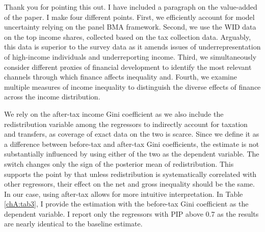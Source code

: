 \begin{enumerate}[resume]
    Thank you for pointing this out. I have included a paragraph on the value-added of the paper. I make four different points. First, we efficiently account for model uncertainty relying on the panel \ac{BMA} framework. Second, we use the \ac{WID} data on the top income shares, collected based on the tax collection data. Arguably, this data is superior to the survey data as it amends issues of underrepresentation of high-income individuals and underreporting income. Third, we simultaneously consider different proxies of financial development to identify the most relevant channels through which finance affects inequality and. Fourth, we examine multiple measures of income inequality to distinguish the diverse effects of finance across the income distribution.
    
    
    We rely on the after-tax income Gini coefficient as we also include the redistribution variable among the regressors to indirectly account for taxation and transfers, as coverage of exact data on the two is scarce. Since we define it as a difference between before-tax and after-tax Gini coefficients, the estimate is not substantially influenced by using either of the two as the dependent variable. The switch changes only the sign of the posterior mean of redistribution. This supports the point by \textcite{furceri2019robust} that unless redistribution is systematically correlated with other regressors, their effect on the net and gross inequality should be the same. In our case, using after-tax allows for more intuitive interpretation. In Table \ref{chA:tab3}, I provide the estimation with the before-tax Gini coefficient as the dependent variable. I report only the regressors with \ac{PIP} above 0.7 as the results are nearly identical to the baseline estimate.


\end{enumerate}

